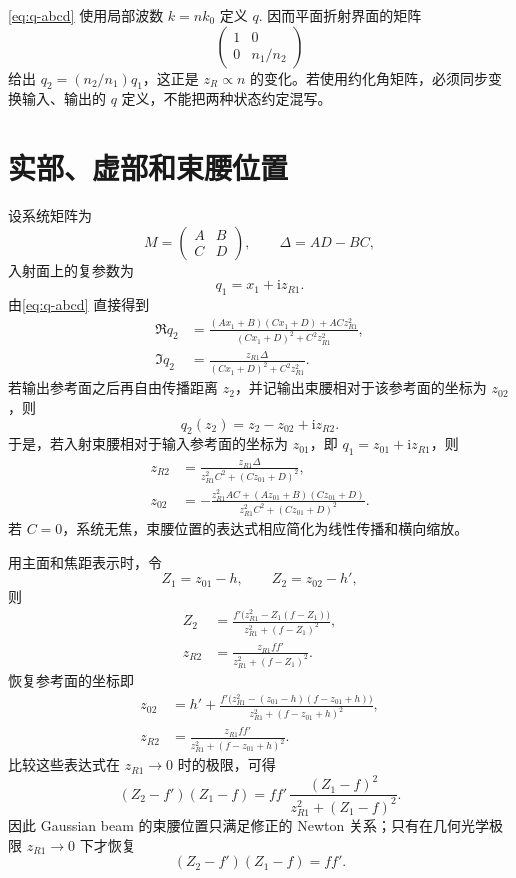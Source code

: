 \cref{eq:q-abcd} 使用局部波数 \(k=nk_0\) 定义 \(q\). 因而平面折射界面的矩阵
\[
	\begin{pmatrix}1&0\\0&n_1/n_2\end{pmatrix}
\]
给出 \(q_2=(n_2/n_1)q_1\)，这正是 \(z_R\propto n\) 的变化。若使用约化角矩阵，必须同步变换输入、输出的 \(q\) 定义，不能把两种状态约定混写。

\section{实部、虚部和束腰位置}

设系统矩阵为
\begin{equation}
	M=
	\begin{pmatrix}A&B\\C&D\end{pmatrix},
\qquad \Delta=AD-BC,
\end{equation}
入射面上的复参数为
\[
	q_1=x_1+\mathrm i z_{R1}.
\]
由\cref{eq:q-abcd} 直接得到
\begin{align}
	\Re q_2&=
	\frac{(Ax_1+B)(Cx_1+D)+ACz_{R1}^2}
	{(Cx_1+D)^2+C^2z_{R1}^2},\\
\Im q_2&=
	\frac{z_{R1}\Delta}
	{(Cx_1+D)^2+C^2z_{R1}^2}.
\end{align}
若输出参考面之后再自由传播距离 \(z_2\)，并记输出束腰相对于该参考面的坐标为 \(z_{02}\)，则
\begin{equation}
	q_2(z_2)=z_2-z_{02}+\mathrm i z_{R2}.
\end{equation}
于是，若入射束腰相对于输入参考面的坐标为 \(z_{01}\)，即 \(q_1=z_{01}+\mathrm i z_{R1}\)，则
\begin{align}
	z_{R2}
	&=\frac{z_{R1}\Delta}
	{z_{R1}^2C^2+(Cz_{01}+D)^2},\\
	z_{02}
	&=-\frac{z_{R1}^2AC+(Az_{01}+B)(Cz_{01}+D)}
	{z_{R1}^2C^2+(Cz_{01}+D)^2}.
\end{align}
若 \(C=0\)，系统无焦，束腰位置的表达式相应简化为线性传播和横向缩放。

用主面和焦距表示时，令
\[
	Z_1=z_{01}-h,\qquad Z_2=z_{02}-h',
\]
则
\begin{align}
	Z_2&=
	\frac{f'\bigl(z_{R1}^2-Z_1(f-Z_1)\bigr)}
	{z_{R1}^2+(f-Z_1)^2},\\
	z_{R2}&=
	\frac{z_{R1}ff'}
	{z_{R1}^2+(f-Z_1)^2}.
\end{align}
恢复参考面的坐标即
\begin{align}
	z_{02}&=h'
	+\frac{f'\bigl(z_{R1}^2-(z_{01}-h)(f-z_{01}+h)\bigr)}
	{z_{R1}^2+(f-z_{01}+h)^2},\\
	z_{R2}&=
	\frac{z_{R1}ff'}
	{z_{R1}^2+(f-z_{01}+h)^2}.
\end{align}
比较这些表达式在 \(z_{R1}\to0\) 时的极限，可得
\begin{equation}
	(Z_2-f')(Z_1-f)
	=
	ff'\,
	\frac{(Z_1-f)^2}{z_{R1}^2+(Z_1-f)^2}.
\end{equation}
因此 Gaussian beam 的束腰位置只满足修正的 Newton 关系；只有在几何光学极限 \(z_{R1}\to0\) 下才恢复
\[
	(Z_2-f')(Z_1-f)=ff'.
\]

